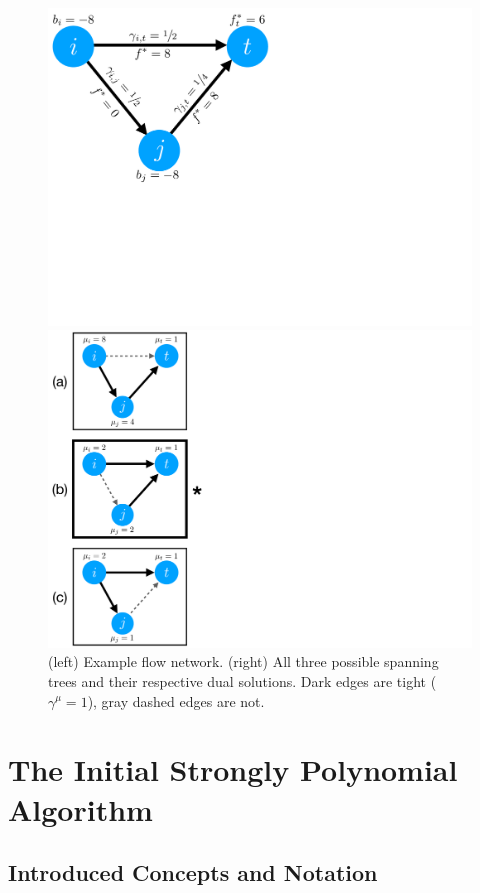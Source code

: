 \documentclass[11pt]{article}
\theoremstyle{definition}
\theoremstyle{definition}
\theoremstyle{definition}
\begin{document}
	\begin{figure}[b!]
	\centering
	\begin{minipage}{.65\textwidth}
		\centering
		\includegraphics[width=0.65\linewidth]{figs/tight}
	\end{minipage}
	\begin{minipage}{.34\textwidth}
		\centering
		\includegraphics[width=.47\linewidth]{figs/tight-span}
	\end{minipage}
\label{fig:ex-spanning}
\caption{(left) Example flow network. (right) All three possible spanning trees and their respective dual solutions. Dark edges are tight ($\gamma^{\mu} = 1$), gray dashed edges are not.}
	\end{figure}


\section{The Initial Strongly Polynomial Algorithm}
\label{sec:2013}
	\subsection{Introduced Concepts and Notation}
    \label{sec:2013-notation}


\end{document}

